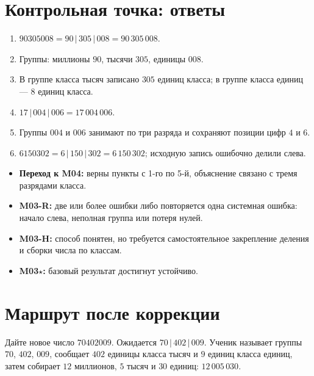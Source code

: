 \section{Контрольная точка: ответы}

\begin{enumerate}
  \item \(90305008=90\,|\,305\,|\,008=90\,305\,008\).
  \item Группы: миллионы \(90\), тысячи \(305\), единицы \(008\).
  \item В группе класса тысяч записано \(305\) единиц класса; в группе класса
    единиц --- \(8\) единиц класса.
  \item \(17\,|\,004\,|\,006=17\,004\,006\).
  \item Группы \(004\) и \(006\) занимают по три разряда и сохраняют позиции
    цифр \(4\) и \(6\).
  \item \(6150302=6\,|\,150\,|\,302=6\,150\,302\); исходную запись ошибочно
    делили слева.
\end{enumerate}

\begin{resultbox}
  \begin{itemize}
    \item \textbf{Переход к M04:} верны пункты с 1-го по 5-й, объяснение связано с
      тремя разрядами класса.
    \item \textbf{M03-R:} две или более ошибки либо повторяется одна системная
      ошибка: начало слева, неполная группа или потеря нулей.
    \item \textbf{M03-H:} способ понятен, но требуется самостоятельное
      закрепление деления и сборки числа по классам.
    \item \textbf{M03\(\star\):} базовый результат достигнут устойчиво.
  \end{itemize}
\end{resultbox}

\newpage
\section{Маршрут после коррекции}

\begin{teacherbox}
  Дайте новое число \(70402009\). Ожидается \(70\,|\,402\,|\,009\). Ученик
  называет группы \(70\), \(402\), \(009\), сообщает \(402\) единицы класса
  тысяч и \(9\) единиц класса единиц, затем собирает \(12\) миллионов,
  \(5\) тысяч и \(30\) единиц:
  \(12\,005\,030\).
\end{teacherbox}

